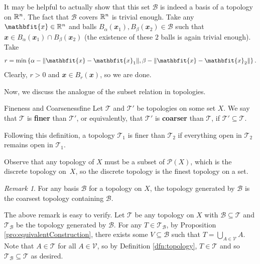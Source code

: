 \documentclass[math]{amznotes}
\theoremstyle{remark}
\newtheorem*{remark}{Remark}
\begin{document}
It may be helpful to actually show that this set $\mathcal{B}$ is indeed a basis of a topology on $\mathbb{R}^n$. The fact that $\mathcal{B}$ covers $\mathbb{R}^n$ is trivial enough. Take any $\mathbfit{x} \in \R^n$ and balls $B_{\alpha}\left(\mathbfit{x}_1\right), B_{\beta}\left(\mathbfit{x}_2\right) \in \mathcal{B}$ such that $\mathbfit{x} \in B_{\alpha}\left(\mathbfit{x}_1\right) \cap B_{\beta}\left(\mathbfit{x}_2\right)$ (the existence of these $2$ balls is again trivial enough). Take 
\begin{equation*}
    r = \min\left\{\alpha - \norm{\mathbfit{x} - \mathbfit{x}_1}, \beta - \norm{\mathbfit{x} - \mathbfit{x}_2}\right\}.
\end{equation*}
Clearly, $r > 0$ and $\mathbfit{x} \in B_r\left(\mathbfit{x}\right)$, so we are done.

Now, we discuss the analogue of the subset relation in topologies.
\begin{dfnbox}{Fineness and Coarseness}{fine}
    Let $\mathcal{T}$ and $\mathcal{T}'$ be topologies on some set $X$. We say that $\mathcal{T}$ is {\color{red} \textbf{finer}} than $\mathcal{T}'$, or equivalently, that $\mathcal{T}'$ is {\color{red} \textbf{coarser}} than $\mathcal{T}$, if $\mathcal{T}' \subseteq \mathcal{T}$.
\end{dfnbox}
Following this definition, a topology $\mathcal{T}_1$ is finer than $\mathcal{T}_2$ if everything open in $\mathcal{T}_2$ remains open in $\mathcal{T}_1$.

Observe that any topology of $X$ must be a subset of $\mathcal{P}\left(X\right)$, which is the discrete topology on~$X$, so the discrete topology is the finest topology on a set.
\begin{notebox}
    \begin{remark}
        For any basis $\mathcal{B}$ for a topology on $X$, the topology generated by $\mathcal{B}$ is the coarsest topology containing $\mathcal{B}$.
    \end{remark}
\end{notebox}
The above remark is easy to verify. Let $\mathcal{T}$ be any topology on $X$ with $\mathcal{B} \subseteq \mathcal{T}$ and $\mathcal{T}_{\mathcal{B}}$ be the topology generated by $\mathcal{B}$. For any $T \in \mathcal{T}_{\mathcal{B}}$, by Proposition \ref{pro:equivalentConstruction}, there exists some $V \subseteq \mathcal{B}$ such that $T = \bigcup_{A \in \mathcal{V}}A$. Note that $A \in \mathcal{T}$ for all $A \in \mathcal{V}$, so by Definition \ref{dfn:topology}, $T \in \mathcal{T}$ and so $\mathcal{T}_{\mathcal{B}} \subseteq \mathcal{T}$ as desired.
\end{document}
